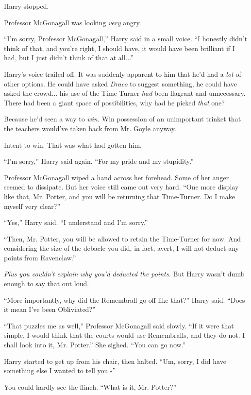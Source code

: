 Harry stopped.

Professor McGonagall was looking \emph{very} angry.

``I'm sorry, Professor McGonagall,'' Harry said in a small voice. ``I
honestly didn't think of that, and you're right, I should have, it would
have been brilliant if I had, but I just didn't think of that at
all...''

Harry's voice trailed off. It was suddenly apparent to him that he'd had
a \emph{lot} of other options. He could have asked \emph{Draco} to
suggest something, he could have asked the crowd... his use of the
Time-Turner \emph{had} been flagrant and unnecessary. There had been a
giant space of possibilities, why had he picked \emph{that} one?

Because he'd seen a way to \emph{win.} Win possession of an unimportant
trinket that the teachers would've taken back from Mr. Goyle anyway.

Intent to win. That was what had gotten him.

``I'm sorry,'' Harry said again. ``For my pride and my stupidity.''

Professor McGonagall wiped a hand across her forehead. Some of her anger
seemed to dissipate. But her voice still came out very hard. ``One more
display like that, Mr. Potter, and you will be returning that
Time-Turner. Do I make myself very clear?''

``Yes,'' Harry said. ``I understand and I'm sorry.''

``Then, Mr. Potter, you will be allowed to retain the Time-Turner for
now. And considering the size of the debacle you did, in fact, avert, I
will not deduct any points from Ravenclaw.''

\emph{Plus you couldn't explain why you'd deducted the points.} But
Harry wasn't dumb enough to say that out loud.

``More importantly, why did the Remembrall go off like that?'' Harry
said. ``Does it mean I've been Obliviated?''

``That puzzles me as well,'' Professor McGonagall said slowly. ``If it
were that simple, I would think that the courts would use Remembralls,
and they do not. I shall look into it, Mr. Potter.'' She sighed. ``You
can go now.''

Harry started to get up from his chair, then halted. ``Um, sorry, I did
have something else I wanted to tell you -''

You could hardly see the flinch. ``What is it, Mr. Potter?''

